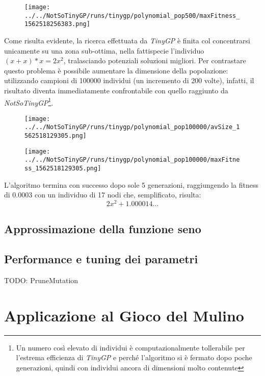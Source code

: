 \documentclass{../llncs}
\newcommand{\labelfig}[1]{\label{fig:#1}}
\begin{document}
\begin{figure}[!htb]
\centering
\texttt{[image: ../../NotSoTinyGP/runs/tinygp/polynomial\_pop500/maxFitness\_1562518256383.png]}
\end{figure}

Come risulta evidente, la ricerca effettuata da \emph{TinyGP} è finita col concentrarsi unicamente su una zona sub-ottima, nella fattispecie l'individuo $(x+x)*x = 2x^2$, tralasciando potenziali soluzioni migliori. Per contrastare questo problema è possibile aumentare la dimensione della popolazione: utilizzando campioni di 100000 individui (un incremento di 200 volte), infatti, il risultato diventa immediatamente confrontabile con quello raggiunto da \emph{NotSoTinyGP}\footnote{Un numero così elevato di individui è computazionalmente tollerabile per l'estrema efficienza di \emph{TinyGP} e perché l'algoritmo si è fermato dopo poche generazioni, quindi con individui ancora di dimensioni molto contenute}.\\

\begin{figure}[!htb]
\centering
\texttt{[image: ../../NotSoTinyGP/runs/tinygp/polynomial\_pop100000/avSize\_1562518129305.png]}
\end{figure}

\begin{figure}[!htb]
\centering
\texttt{[image: ../../NotSoTinyGP/runs/tinygp/polynomial\_pop100000/maxFitness\_1562518129305.png]}
\end{figure}

L'algoritmo termina con successo dopo sole 5 generazioni, raggiungendo la fitness di $0.0003$ con un individuo di 17 nodi che, semplificato, risulta:
\[
2x^2+1.000014\ldots
\]

\subsection{Approssimazione della funzione seno}
\subsection{Performance e tuning dei parametri}
TODO: PruneMutation

\section{Applicazione al Gioco del Mulino}
\end{document}
